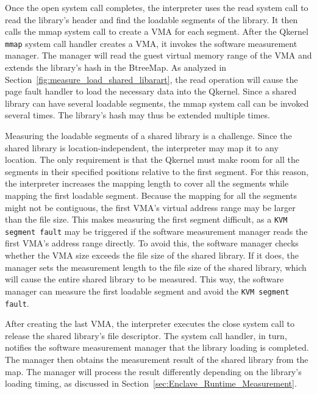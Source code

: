 Once the open system call completes, the interpreter uses the read system call to read the library's header and find the loadable segments of the library. It then calls the mmap system call to create a \acrshort{VMA} for each segment. After the Qkernel \texttt{mmap} system 
call handler creates a \acrshort{VMA}, it invokes the software measurement manager. The manager will read the guest virtual memory range of the \acrshort{VMA} and extends the library's hash in the BtreeMap. As analyzed in Section~\ref{fig:measure_load_shared_libarart}, the read operation will cause 
the page fault handler to load the necessary data into the Qkernel. Since a shared library can have several loadable segments, the mmap system call can be invoked several times. The library's hash may thus be extended multiple times.


Measuring the loadable segments of a shared library is a challenge. Since the shared library is location-independent, the interpreter may map it to any location. The only requirement is that the Qkernel must make room for all the segments in their specified positions relative to the first segment. 
For this reason, the interpreter increases the mapping length to cover all the segments while mapping the first loadable segment. Because the mapping for all the segments might not be contiguous, the first \acrshort{VMA}'s virtual address range may be larger than the file size. This makes measuring 
the first segment difficult, as a \texttt{KVM segment fault} may be triggered if the software measurement manager reads the first \acrshort{VMA}'s address range directly. To avoid this, the software manager checks whether the \acrshort{VMA} size exceeds the file size of the shared library. 
If it does, the manager sets the measurement length to the file size of the shared library, which will cause the entire shared library to be measured. This way, the software manager can measure the first loadable segment and avoid the \texttt{KVM segment fault}.



After creating the last \acrshort{VMA}, the interpreter executes the close system call to release the shared library's file descriptor. The system call handler, in turn, notifies the software measurement manager that the library loading is completed. The manager then obtains the measurement 
result of the shared library from the map. The manager will process the result differently depending on the library's loading timing, as discussed in Section~\ref{sec:Enclave_Runtime_Measurement}.
